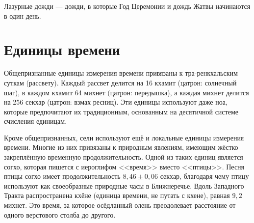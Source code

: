 Лазурные дожди --- дожди, в которые Год Церемонии и дождь Жатвы начинаются в один день.


\section{Единицы времени}

Общепризнанные единицы измерения времени привязаны к тра-ренкхальским суткам (рассвету).
Каждый рассвет делится на 16 кхамит (цатрон: солнечный шаг), в каждом кхамит 64 михнет (цатрон: передышка), а каждая михнет делится на 256 секхар (цатрон: взмах ресниц).
Эти единицы используют даже ноа, которые предпочитают их традиционным, основанным на десятичной системе счисления единицам.

Кроме общепризнанных, сели используют ещё и локальные единицы измерения времени.
Многие из них привязаны к природным явлениям, имеющим жёстко закреплённую временную продолжительность.
Одной из таких единиц является согхо, которая пишется с иероглифом <<время>> вместо <<птицы>>.
Песня птицы согхо имеет продолжительность $8,46\pm0,06$ секхар, благодаря чему птицу используют как своеобразные природные часы в Ближнеречье.
Вдоль Западного Тракта распространена кхёне (единица времени, не путать с кхене), равная $9,2$ михнет.
Это время, за которое осёдланный олень преодолевает расстояние от одного верстового столба до другого.

